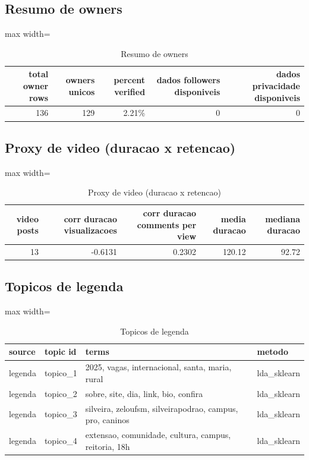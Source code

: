 \documentclass[12pt,a4paper]{article}
\begin{document}
\subsection{Resumo de owners}
\begin{table}[H]
\centering
\scriptsize
\begin{adjustbox}{max width=\textwidth}
\begin{tabular}{r r r r r}
\toprule
total owner rows & owners unicos & percent verified & dados followers disponiveis & dados privacidade disponiveis \\
\midrule
136 & 129 & 2.21\% & 0 & 0 \\
\bottomrule
\end{tabular}
\end{adjustbox}
\caption{Resumo de owners}
\label{tab:owners}
\end{table}

\subsection{Proxy de video (duracao x retencao)}
\begin{table}[H]
\centering
\scriptsize
\begin{adjustbox}{max width=\textwidth}
\begin{tabular}{r r r r r}
\toprule
video posts & corr duracao visualizacoes & corr duracao comments per view & media duracao & mediana duracao \\
\midrule
13 & -0.6131 & 0.2302 & 120.12 & 92.72 \\
\bottomrule
\end{tabular}
\end{adjustbox}
\caption{Proxy de video (duracao x retencao)}
\label{tab:video}
\end{table}

\subsection{Topicos de legenda}
\begin{table}[H]
\centering
\scriptsize
\begin{adjustbox}{max width=\textwidth}
\begin{tabular}{l l l l}
\toprule
source & topic id & terms & metodo \\
\midrule
legenda & topico\_1 & 2025, vagas, internacional, santa, maria, rural & lda\_sklearn \\
legenda & topico\_2 & sobre, site, dia, link, bio, confira & lda\_sklearn \\
legenda & topico\_3 & silveira, zeloufsm, silveirapodrao, campus, pro, caninos & lda\_sklearn \\
legenda & topico\_4 & extensao, comunidade, cultura, campus, reitoria, 18h & lda\_sklearn \\
\bottomrule
\end{tabular}
\end{adjustbox}
\caption{Topicos de legenda}
\label{tab:topics\_legenda}
\end{table}
\end{document}
